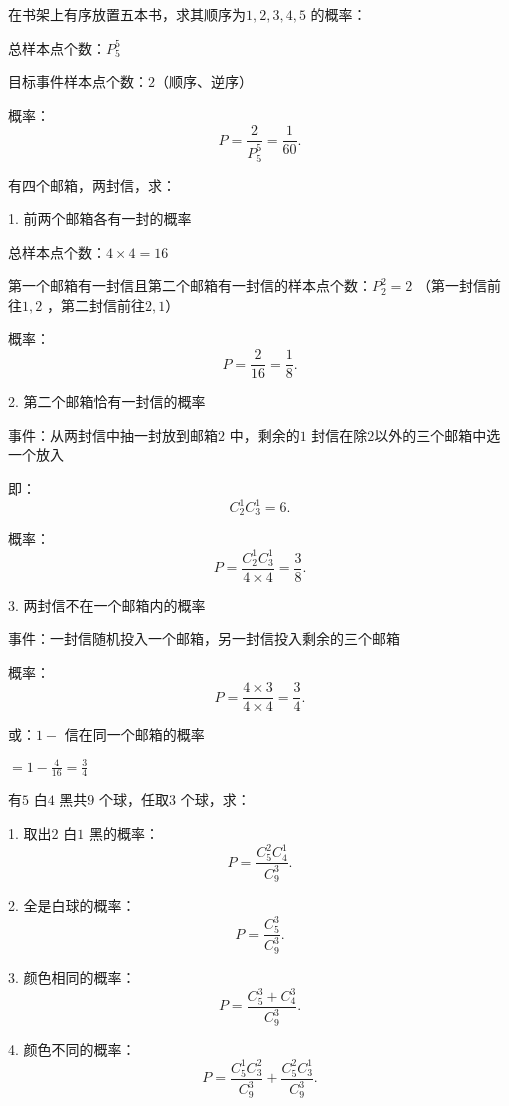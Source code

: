 \begin{eg}
    在书架上有序放置五本书，求其顺序为$1,2,3,4,5$ 的概率：

    总样本点个数：$P_{5}^{5}$

    目标事件样本点个数：$2$（顺序、逆序）

    概率： \[
        P=\frac{2}{P_{5}^{5}}= \frac{1}{60}
    .\] 
\end{eg}
\begin{eg}
    有四个邮箱，两封信，求：

    1. 前两个邮箱各有一封的概率

    总样本点个数：$4\times 4=16$ 

    第一个邮箱有一封信且第二个邮箱有一封信的样本点个数：$P_{2}^{2}=2$ （第一封信前往$1,2$ ，第二封信前往$2,1$）

    概率：\[
        P=\frac{2}{16}=\frac{1}{8}
    .\] 

    2. 第二个邮箱恰有一封信的概率

    事件：从两封信中抽一封放到邮箱$2$ 中，剩余的$1$ 封信在除$2$以外的三个邮箱中选一个放入

    即：\[
        C_{2}^{1}C_{3}^{1}=6
    .\] 

    概率：\[
        P=\frac{C_{2}^{1}C_{3}^{1}}{4\times 4}=\frac{3}{8}
    .\] 

    3. 两封信不在一个邮箱内的概率

    事件：一封信随机投入一个邮箱，另一封信投入剩余的三个邮箱

    概率：
    \[
        P=\frac{4\times 3}{4\times 4}=\frac{3}{4}
    .\] 
    
    或：$1-$ 信在同一个邮箱的概率

    $\displaystyle{=1-\frac{4}{16}=\frac{3}{4}}$
\end{eg}
\begin{eg}
    有$5$ 白$4$ 黑共$9$ 个球，任取$3$ 个球，求：

    1. 取出$2$ 白$1$ 黑的概率：\[
        P=\frac{C_{5}^{2}C_{4}^{1}}{C_{9}^{3}}
    .\] 

    2. 全是白球的概率：\[
        P=\frac{C_{5}^{3}}{C_{9}^{3}}
    .\] 

    3. 颜色相同的概率：\[
        P=\frac{C_{5}^{3}+C_{4}^{3}}{C_{9}^{3}}
    .\] 

    4. 颜色不同的概率：\[
        P=\frac{C_{5}^{1}C_{3}^{2}}{C_{9}^{3}}+\frac{C_{5}^{2}C_{3}^{1}}{C_{9}^{3}}
    .\] 
\end{eg}
